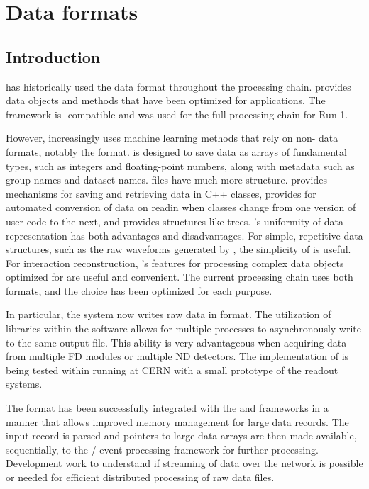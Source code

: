 \documentclass[../main-v1.tex]{subfiles}
\begin{document}
\chapter{Data formats}
\label{ch:format}

\section{Introduction} 

 has historically used the  data format throughout the processing chain.   provides data objects and methods that have been optimized for  applications.  The  framework is -compatible and  was used for the full processing chain for  Run 1. 

However,  increasingly uses   machine learning methods that rely on non- data formats, notably the  format.   is designed to save data as arrays of fundamental types, such as integers and floating-point numbers, along with metadata such as group names and dataset names.   files have much more structure.   provides mechanisms for saving and retrieving data in C++ classes, provides for automated conversion of data on readin when classes change from one version of user code to the next, and provides structures like trees. 's uniformity of data representation has both advantages and disadvantages. For simple, repetitive data structures, such as the raw waveforms generated by , the simplicity of  is useful.  For interaction reconstruction, 's features for processing complex data objects optimized for  are useful and convenient.  The current  processing chain uses both formats, and the choice has been optimized for each purpose.

In particular, the   system now writes raw data in  format. The utilization of  libraries within the  software allows for multiple processes to asynchronously write to the same output file. This ability is very advantageous when acquiring data from multiple FD modules or multiple ND detectors. The implementation of  is being tested within  running at CERN with a small prototype of the  readout systems. 

The  format has been successfully integrated with the  and  frameworks in a manner that allows improved memory management for large data records.  The  input  record is parsed and pointers to large data arrays are then made available, sequentially, to the / event processing framework for further processing. Development work to understand if streaming of  data over the network is possible or needed for efficient distributed processing of raw data files.
\end{document}
